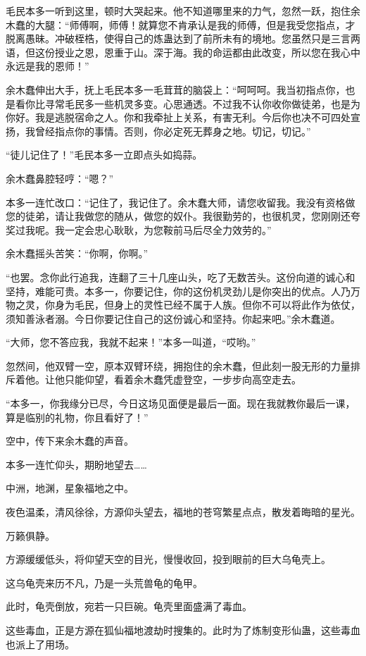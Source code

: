 \begin{this_body}
毛民本多一听到这里，顿时大哭起来。他不知道哪里来的力气，忽然一跃，抱住余木蠢的大腿：“师傅啊，师傅！就算您不肯承认是我的师傅，但是我受您指点，才脱离愚昧。冲破桎梏，使得自己的炼蛊达到了前所未有的境地。您虽然只是三言两语，但这份授业之恩，恩重于山。深于海。我的命运都由此改变，所以您在我心中永远是我的恩师！”

余木蠢伸出大手，抚上毛民本多一毛茸茸的脑袋上：“呵呵呵。我当初指点你，也是看你比寻常毛民多一些机灵多变。心思通透。不过我不认你收你做徒弟，也是为你好。我是逃脱宿命之人。你和我牵扯上关系，有害无利。今后你也决不可四处宣扬，我曾经指点你的事情。否则，你必定死无葬身之地。切记，切记。”

“徒儿记住了！”毛民本多一立即点头如捣蒜。

余木蠢鼻腔轻哼：“嗯？”

本多一连忙改口：“记住了，我记住了。余木蠢大师，请您收留我。我没有资格做您的徒弟，请让我做您的随从，做您的奴仆。我很勤劳的，也很机灵，您刚刚还夸奖过我呢。我一定会忠心耿耿，为您鞍前马后尽全力效劳的。”

余木蠢摇头苦笑：“你啊，你啊。”

“也罢。念你此行追我，连翻了三十几座山头，吃了无数苦头。这份向道的诚心和坚持，难能可贵。本多一，你要记住，你的这份机灵劲儿是你突出的优点。人乃万物之灵，你身为毛民，但身上的灵性已经不属于人族。但你不可以将此作为依仗，须知善泳者溺。今日你要记住自己的这份诚心和坚持。你起来吧。”余木蠢道。

“大师，您不答应我，我就不起来！”本多一叫道，“哎哟。”

忽然间，他双臂一空，原本双臂环绕，拥抱住的余木蠢，但此刻一股无形的力量排斥着他。让他只能仰望，看着余木蠢凭虚登空，一步步向高空走去。

“本多一，你我缘分已尽，今日这场见面便是最后一面。现在我就教你最后一课，算是临别的礼物，你且看好了！”

空中，传下来余木蠢的声音。

本多一连忙仰头，期盼地望去……

中洲，地渊，星象福地之中。

夜色温柔，清风徐徐，方源仰头望去，福地的苍穹繁星点点，散发着晦暗的星光。

万籁俱静。

方源缓缓低头，将仰望天空的目光，慢慢收回，投到眼前的巨大乌龟壳上。

这乌龟壳来历不凡，乃是一头荒兽龟的龟甲。

此时，龟壳倒放，宛若一只巨碗。龟壳里面盛满了毒血。

这些毒血，正是方源在狐仙福地渡劫时搜集的。此时为了炼制变形仙蛊，这些毒血也派上了用场。


\end{this_body}
